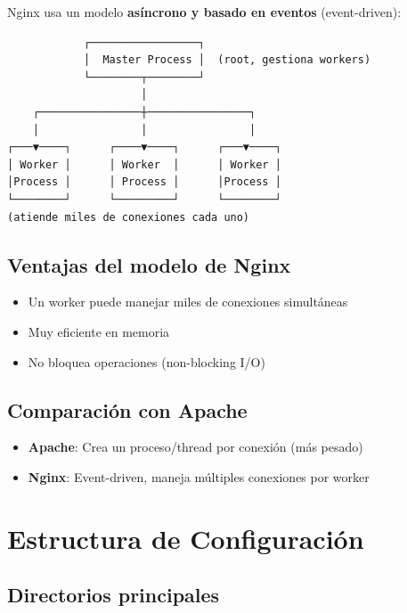 \documentclass[11pt,a4paper]{article}
\begin{document}
Nginx usa un modelo \textbf{asíncrono y basado en eventos} (event-driven):

\begin{tcolorbox}[colback=blue!5!white,colframe=blue!75!black,title=Estructura de procesos]
\begin{verbatim}
            ┌─────────────────┐
            │  Master Process │  (root, gestiona workers)
            └────────┬────────┘
                     │
    ┌────────────────┼────────────────┐
    │                │                │
┌───▼────┐      ┌────▼────┐      ┌───▼────┐
│ Worker │      │ Worker  │      │ Worker │
│Process │      │ Process │      │Process │
└────────┘      └─────────┘      └────────┘
(atiende miles de conexiones cada uno)
\end{verbatim}
\end{tcolorbox}

\subsection{Ventajas del modelo de Nginx}
\begin{itemize}
    \item Un worker puede manejar miles de conexiones simultáneas
    \item Muy eficiente en memoria
    \item No bloquea operaciones (non-blocking I/O)
\end{itemize}

\subsection{Comparación con Apache}
\begin{itemize}
    \item \textbf{Apache}: Crea un proceso/thread por conexión (más pesado)
    \item \textbf{Nginx}: Event-driven, maneja múltiples conexiones por worker
\end{itemize}

\section{Estructura de Configuración}

\subsection{Directorios principales}
\end{document}

